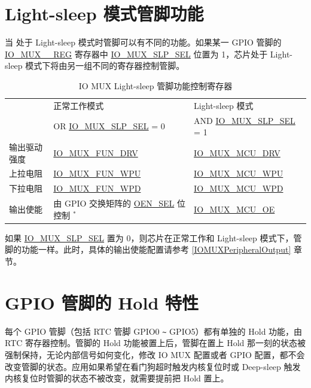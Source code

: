 \documentclass[main\_\_CN.tex]{subfiles}
\begin{document}
\section{Light-sleep 模式管脚功能}

当 \chipname{} 处于 Light-sleep 模式时管脚可以有不同的功能。如果某一 GPIO 管脚的 \hyperref[regdesc:IOMUXGPIONREG]{IO\_MUX\_\_REG} 寄存器中 \hyperref[fielddesc:IOMUXGPIONSLPSEL]{IO\_MUX\_SLP\_SEL} 位置为 1，芯片处于 Light-sleep 模式下将由另一组不同的寄存器控制管脚。

\begin{longtable}[c]{|p{3cm}|m{6.5cm}|m{5cm}|}
\caption{IO MUX Light-sleep 管脚功能控制寄存器}
\label{tab:iomuxgpio-pin-function-register-light-sleep-mode} \\
    \hline
    \rowcolor{lightgray}
   & 正常工作模式 & Light-sleep 模式 \\
    \rowcolor{lightgray}
   \multirow{-2}{*}{IO MUX 功能}  & OR \hyperref[fielddesc:IOMUXGPIONSLPSEL]{IO\_MUX\_SLP\_SEL} = 0 & AND \hyperref[fielddesc:IOMUXGPIONSLPSEL]{IO\_MUX\_SLP\_SEL} = 1 \\
    \hline
输出驱动强度 & \hyperref[fielddesc:IOMUXGPIONFUNDRV]{IO\_MUX\_FUN\_DRV} & \hyperref[fielddesc:IOMUXGPIONMCUDRV]{IO\_MUX\_MCU\_DRV} \\ 
\hline
上拉电阻 & \hyperref[fielddesc:IOMUXGPIONFUNWPU]{IO\_MUX\_FUN\_WPU} & \hyperref[fielddesc:IOMUXGPIONMCUWPU]{IO\_MUX\_MCU\_WPU} \\
\hline
下拉电阻 & \hyperref[fielddesc:IOMUXGPIONFUNWPD]{IO\_MUX\_FUN\_WPD} & \hyperref[fielddesc:IOMUXGPIONMCUWPD]{IO\_MUX\_MCU\_WPD} \\
\hline
输出使能 & 由 GPIO 交换矩阵的 \hyperref[fielddesc:GPIOFUNCNOENSEL]{OEN\_SEL} 位控制 $^{*}$ & \hyperref[fielddesc:IOMUXGPIONMCUOE]{IO\_MUX\_MCU\_OE} \\
\hline
\end{longtable}

\begin{tiplisting}
如果 \hyperref[fielddesc:IOMUXGPIONSLPSEL]{IO\_MUX\_SLP\_SEL} 置为 0，则芯片在正常工作和 Light-sleep 模式下，管脚的功能一样。此时，具体的输出使能配置请参考 \ref{IOMUXPeripheralOutput} 章节。

\end{tiplisting}

\section{GPIO 管脚的 Hold 特性}\label{PadHold}
每个 GPIO 管脚（包括 RTC 管脚 GPIO0 \verb+~+ GPIO5）都有单独的 Hold 功能，由 RTC 寄存器控制。管脚的 Hold 功能被置上后，管脚在置上 Hold 那一刻的状态被强制保持，无论内部信号如何变化，修改 IO MUX 配置或者 GPIO 配置，都不会改变管脚的状态。应用如果希望在看门狗超时触发内核复位时或 Deep-sleep 触发内核复位时管脚的状态不被改变，就需要提前把 Hold 置上。
\end{document}
